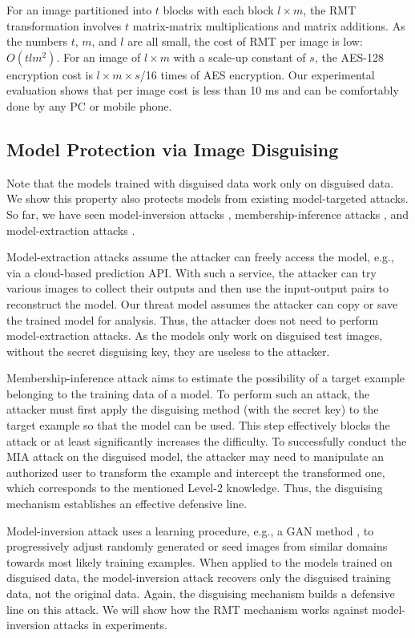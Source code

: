 \documentclass[conference]{IEEEtran}
\begin{document}
For an image partitioned into $t$ blocks with each block $l \times m$, the RMT transformation involves $t$ matrix-matrix multiplications and matrix additions. As the numbers $t$, $m$, and $l$ are all small, the cost of RMT per image is low: $O(tlm^2)$. For an image of $l \times m$ with a scale-up constant of $s$, the AES-128 encryption cost is $l \times m \times s$/16 times of AES encryption. 
Our experimental evaluation shows that per image cost is less than 10 ms and can be comfortably done by any PC or mobile phone. 

\subsection{Model Protection via Image Disguising}
Note that the models trained with disguised data work only on disguised data. We show this property also protects models from existing model-targeted attacks. So far, we have seen model-inversion attacks \cite{fredrikson15,zhang20}, membership-inference attacks \cite{shokri16,hu22}, and model-extraction attacks \cite{tramer16,jagielski2020}. 

Model-extraction attacks assume the attacker can freely access the model, e.g., via a cloud-based prediction API. With such a service, the attacker can try various images to collect their outputs and then use the input-output pairs to reconstruct the model. Our threat model assumes the attacker can copy or save the trained model for analysis. Thus, the attacker does not need to perform model-extraction attacks. As the models only work on disguised test images, without the secret disguising key, they are useless to the attacker. 

Membership-inference attack aims to estimate the possibility of a target example belonging to the training data of a model. To perform such an attack, the attacker must first apply the disguising method (with the secret key) to the target example so that the model can be used. This step effectively blocks the attack or at least significantly increases the difficulty. To successfully conduct the MIA attack on the disguised model, the attacker may need to manipulate an authorized user to transform the example and intercept the transformed one, which corresponds to the mentioned Level-2 knowledge. Thus, the disguising mechanism establishes an effective defensive line. 

Model-inversion attack uses a learning procedure, e.g., a GAN method \cite{zhang20}, to progressively adjust randomly generated or seed images from similar domains towards most likely training examples. When applied to the models trained on disguised data, the model-inversion attack recovers only the disguised training data, not the original data. Again, the disguising mechanism builds a defensive line on this attack. We will show how the RMT mechanism works against model-inversion attacks in experiments. 
\end{document}
